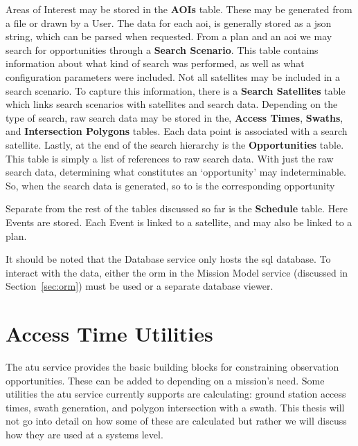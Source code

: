 Areas of Interest may be stored in the \textbf{AOIs} table. These may be
generated from a file or drawn by a User. The data for each \gls{aoi}, is
generally stored as a \gls{json} string, which can be parsed when requested.
From a plan and an \gls{aoi} we may search for opportunities through a
\textbf{Search Scenario}.  This table contains information about what kind of
search was performed, as well as what configuration parameters were included.
Not all satellites may be included in a search scenario. To capture this
information, there is a \textbf{Search Satellites} table which links search
scenarios with satellites and search data.  Depending on the type of search,
raw search data may be stored in the, \textbf{Access Times}, \textbf{Swaths},
and \textbf{Intersection Polygons} tables. Each data point is associated with a
search satellite. Lastly, at the end of the search hierarchy is the
\textbf{Opportunities} table.  This table is simply a list of references to raw
search data. With just the raw search data, determining what constitutes an
`opportunity' may indeterminable.  So, when the search data is generated, so to
is the corresponding opportunity

Separate from the rest of the tables discussed so far is the \textbf{Schedule}
table. Here Events are stored. Each Event is linked to a satellite, and may
also be linked to a plan.

It should be noted that the Database service only hosts the \gls{sql} database.
To interact with the data, either the \acrshort{orm} in the Mission Model
service (discussed in Section~\ref{sec:orm}) must be used or a separate
database viewer.




\section{Access Time Utilities}\label{sec:atu}

The \gls{atu} service provides the basic building blocks for constraining
observation opportunities. These can be added to depending on a mission’s need.
Some utilities the \gls{atu} service currently supports are calculating: ground
station access times, swath generation, and polygon intersection with a swath.
This thesis will not go into detail on how some of these are calculated but
rather we will discuss how they are used at a systems level.

